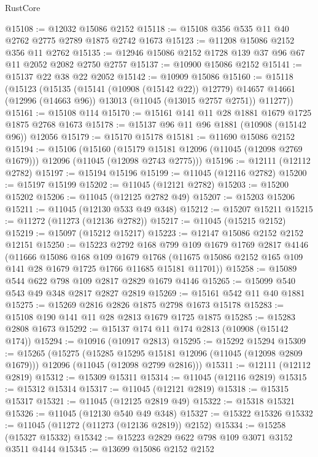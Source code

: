 \begin{lexlean}{RustCore}
\begin{coremodule}
@15108 := @12032 @15086 @2152
@15118 := @15108 @356 @535 @11 @40 @2762 @2775 @2789 @1875 @2742 @1673
@15123 := @11208 @15086 @2152 @356 @11 @2762
@15135 := @12946 @15086 @2152 @1728 @139 @37 @96 @67 @11 @2052 @2082 @2750 @2757
@15137 := @10900 @15086 @2152
@15141 := @15137 @22 @38 @22 @2052
@15142 := @10909 @15086
@15160 := @15118
    (@15123
      (@15135
        (@15141 (@10908 (@15142 @22)) @12779)
        @14657
        @14661
        (@12996 (@14663 @96))
        @13013
        (@11045 (@13015 @2757 @2751))
        @11277))
@15161 := @15108 @114
@15170 := @15161 @141 @11 @28 @1881 @1679 @1725 @1875 @2768 @1673
@15178 := @15137 @96 @11 @96 @1881 (@10908 (@15142 @96)) @12056
@15179 := @15170 @15178
@15181 := @11690 @15086 @2152
@15194 := @15106
    (@15160
      (@15179 @15181 @12096 (@11045 (@12098 @2769 @1679)))
      @12096
      (@11045 (@12098 @2743 @2775)))
@15196 := @12111 (@12112 @2782)
@15197 := @15194 @15196
@15199 := @11045 (@12116 @2782)
@15200 := @15197 @15199
@15202 := @11045 (@12121 @2782)
@15203 := @15200 @15202
@15206 := @11045 (@12125 @2782 @49)
@15207 := @15203 @15206
@15211 := @11045 (@12130 @533 @49 @348)
@15212 := @15207 @15211
@15215 := @11272 (@11273 (@12136 @2782))
@15217 := @11045 (@15215 @2152)
@15219 := @15097 (@15212 @15217)
@15223 := @12147 @15086 @2152 @2152 @12151
@15250 := @15223
    @2792
    @168
    @799
    @109
    @1679
    @1769
    @2817
    @4146
    (@11666
      @15086
      @168
      @109
      @1679
      @1768
      (@11675 @15086 @2152 @165 @109 @141 @28 @1679 @1725 @1766 @11685 @15181 @11701))
@15258 := @15089 @544 @622 @798 @109 @2817 @2829 @1679 @4146
@15265 := @15099 @540 @543 @49 @348 @2817 @2827 @2819
@15269 := @15161 @542 @11 @40 @1881
@15275 := @15269 @2816 @2826 @1875 @2798 @1673 @15178
@15283 := @15108 @190 @141 @11 @28 @2813 @1679 @1725 @1875
@15285 := @15283 @2808 @1673
@15292 := @15137 @174 @11 @174 @2813 (@10908 (@15142 @174))
@15294 := @10916 (@10917 @2813)
@15295 := @15292 @15294
@15309 := @15265
    (@15275
      (@15285 @15295 @15181 @12096 (@11045 (@12098 @2809 @1679)))
      @12096
      (@11045 (@12098 @2799 @2816)))
@15311 := @12111 (@12112 @2819)
@15312 := @15309 @15311
@15314 := @11045 (@12116 @2819)
@15315 := @15312 @15314
@15317 := @11045 (@12121 @2819)
@15318 := @15315 @15317
@15321 := @11045 (@12125 @2819 @49)
@15322 := @15318 @15321
@15326 := @11045 (@12130 @540 @49 @348)
@15327 := @15322 @15326
@15332 := @11045 (@11272 (@11273 (@12136 @2819)) @2152)
@15334 := @15258 (@15327 @15332)
@15342 := @15223 @2829 @622 @798 @109 @3071 @3152 @3511 @4144
@15345 := @13699 @15086 @2152 @2152

\end{coremodule}
\end{lexlean}
